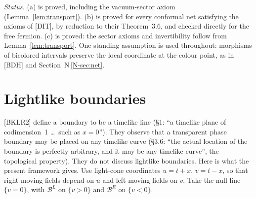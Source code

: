 \documentclass[11pt]{article}
\theoremstyle{definition}
\theoremstyle{remark}
\newcommand{\cB}{\mathcal B}
\newcommand{\nref}[1]{N\,\ref{N-#1}}
\begin{document}
\emph{Status.} (a) is proved, including the vacuum-sector axiom (Lemma~\ref{lem:transport}). (b) is proved for every conformal net satisfying the axioms of [DIT], by reduction to their Theorem~3.6, and checked directly for the free fermion. (c) is proved: the sector axioms and invertibility follow from Lemma~\ref{lem:transport}. One standing assumption is used throughout: morphisms of bicolored intervals preserve the local coordinate at the colour point, as in [BDH] and Section~\nref{sec:net}.

\section{Lightlike boundaries}\label{sec:null}
[BKLR2] define a boundary to be a timelike line (\S1: ``a timelike plane of codimension~1 \dots\ such as $x=0$''). They observe that a transparent phase boundary may be placed on any timelike curve (\S3.6: ``the actual location of the boundary is perfectly arbitrary, and it may be any timelike curve'', the topological property). They do not discuss lightlike boundaries. Here is what the present framework gives. Use light-cone coordinates $u=t+x$, $v=t-x$, so that right-moving fields depend on $u$ and left-moving fields on $v$. Take the null line $\{v=0\}$, with $\cB^L$ on $\{v>0\}$ and $\cB^R$ on $\{v<0\}$.
\end{document}

